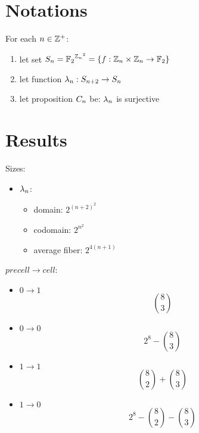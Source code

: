 \documentclass{paper}
\begin{document}

\begin{center}
\Large{\mytitle}
\end{center}

\tableofcontents

\begin{flushleft}


\section{Notations}

For each $n \in \mathbb{Z}^+$:
\begin{enumerate}
\item let set $S_{n} = {\mathbb{F}_2}^{{\mathbb{Z}_n}^2} =
  \{f: \mathbb{Z}_n \times \mathbb{Z}_n \to \mathbb{F}_2\}$
\item let function $\lambda_{n}: S_{n+2} \to S_{n}$
\item let proposition $C_{n}$ be: $\lambda_{n}$ is surjective
\end{enumerate}


\section{Results}

\begin{remark}
Sizes:
\begin{itemize}
\item $\lambda_{n}$:
  \begin{itemize}
  \item domain: $2^{(n+2)^2}$
  \item codomain: $2^{n^2}$
  \item average fiber: $2^{4(n+1)}$
  \end{itemize}
\end{itemize}
\end{remark}

\begin{remark}
$precell \to cell$:
\begin{itemize}
\item $0 \to 1$ $$\binom{8}{3}$$
\item $0 \to 0$ $$2^8 - \binom{8}{3}$$
\item $1 \to 1$ $$\binom{8}{2} + \binom{8}{3}$$
\item $1 \to 0$ $$2^8 - \binom{8}{2} - \binom{8}{3}$$
\end{itemize}
\end{remark}


\end{flushleft}
\end{document}
